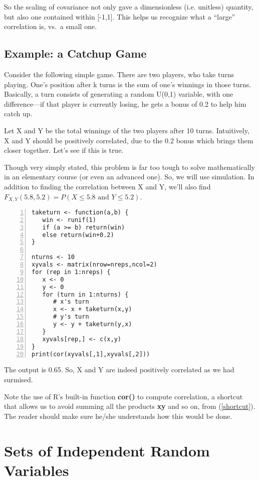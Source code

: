 So the scaling of covariance not only gave a dimensionless (i.e.
unitless) quantity, but also one contained within [-1,1].  This helps us
recognize what a ``large'' correlation is, vs.\ a small one.

\subsection{Example:  a Catchup Game}
\label{catchupgame}

Consider the following simple game.  There are two players, who take
turns playing.  One's position after k turns is the sum of one's
winnings in those turns.  Basically, a turn consists of generating a
random U(0,1) variable, with one difference---if that player is
currently losing, he gets a bonus of 0.2 to help him catch up.  

Let X and Y be the total winnings of the two players after 10 turns.
Intuitively, X and Y should be positively correlated, due to the 0.2
bonus which brings them closer together.  Let's see if this is true.

Though very simply stated, this problem is far too tough to solve
mathematically in an elementary course (or even an advanced one).  So,
we will use simulation.  In addition to finding the correlation between
X and Y, we'll also find $F_{X,Y}(5.8,5.2) = 
P(X \leq 5.8 \textrm{ and } Y \leq 5.2)$. 

\begin{Verbatim}[fontsize=\relsize{-2},numbers=left]
taketurn <- function(a,b) {
   win <- runif(1)
   if (a >= b) return(win)
   else return(win+0.2)
}

nturns <- 10
xyvals <- matrix(nrow=nreps,ncol=2)
for (rep in 1:nreps) {
   x <- 0
   y <- 0
   for (turn in 1:nturns) {
      # x's turn
      x <- x + taketurn(x,y)
      # y's turn
      y <- y + taketurn(y,x)
   }
   xyvals[rep,] <- c(x,y)
}
print(cor(xyvals[,1],xyvals[,2]))
\end{Verbatim}

The output is 0.65.  So, X and Y are indeed positively correlated as we
had surmised.

Note the use of R's built-in function {\bf cor()} to compute
correlation, a shortcut that allows us to avoid summing all the products
{\bf xy} and so on, from (\ref{shortcut}).  The reader should make sure
he/she understands how this would be done.

\section{Sets of Independent Random Variables}

